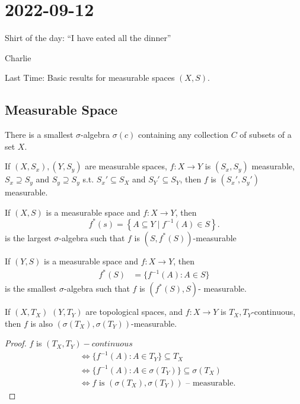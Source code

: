 \section{2022-09-12}

\epigraph{Shirt of the day: ``I have eated all the dinner''}{Charlie}

Last Time: Basic results for measurable spaces $(X, S)$.

\subsection{Measurable Space}

\begin{theorem}
  There is a smallest $\sigma$-algebra $\sigma(c)$ containing any collection $C$ of subsets of a set $X$.
\end{theorem}

\begin{lemma}
	If $(X,S_x), (Y,S_y)$ are measurable spaces, $f: X \to Y$ is $(S_x, S_y)$ measurable, $S_x \supseteq S_y$ and $S_y\supseteq S_y$ s.t. $S_x' \subseteq S_X$ and $S_Y' \subseteq S_Y$, then $f$ is $(S_x', S_y')$ measurable.
\end{lemma}

\begin{theorem}
  If $(X, S)$ is a measurable space and $f: X \to Y$, then 
	\[
		f^*(s) = \left\{A \subseteq Y \mid f^{-1}(A) \in S \right\}.
	\]
	is the largest $\sigma$-algebra such that $f$ is $(S, f^*(S))$-measurable
\end{theorem}

\begin{theorem}
	If $(Y,S)$ is a measurable space and $f : X \to Y$, then 
	 \begin{align*}
		 f^*(S) &= \{f^{-1}(A) : A \in S\}
	\end{align*}
	is the smallest $\sigma$-algebra such that $f$ is $(f^*(S), S)$- measurable.
\end{theorem}

\begin{theorem}
	If $(X, T_X)$ $(Y,T_Y)$ are topological spaces, and  $f : X \to Y$ is $T_X, T_Y$-continuous, then $f$ is also $(\sigma(T_X), \sigma(T_Y))$-measurable.
\end{theorem}

\begin{proof}
	$f$ is $(T_X,T_Y)-continuous$
	\begin{align*}
		&\iff \{f^{-1}(A) : A \in T_Y\} \subseteq T_X \\
		&\iff \{f^{-1}(A) : A \in \sigma(T_Y)\} \subseteq \sigma(T_X) \\
		&\iff f \text{ is } (\sigma(T_X), \sigma(T_Y)) \text{ -- measurable.}
	\end{align*}  
\end{proof}

